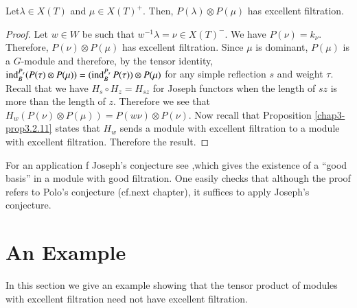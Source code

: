 \begin{corollary}[Joseph]\label{chap5-coro5.2.7}
Let\pageoriginale $\lambda\in X(T)$\label{page54} and $\mu\in X(T)^{+}$. Then,
$P(\lambda)\otimes P(\mu)$ has excellent filtration.
\end{corollary}

\begin{proof}
Let $w\in W$ be such that $w^{-1}\lambda=\nu\in X(T)^{-}$. We have
$P(\nu)=k_{\nu}$. Therefore, $P(\nu)\otimes P(\mu)$ has excellent
filtration. Since $\mu$ is dominant, $P(\mu)$ is a $G$-module and
therefore, by the tensor identity, $\operatorname{ind}^{P_{s}}_{B}(P(\tau)\otimes
P(\mu))=(\operatorname{ind}^{P_{s}}_{B}P(\tau))\otimes P(\mu)$ for any simple
reflection $s$ and weight $\tau$. Recall that we have $H_{s}\circ
H_{z}=H_{sz}$ for Joseph functors when the length of $sz$ is more than
the length of $z$. Therefore we see that $H_{w}(P(\nu)\otimes
P(\mu))=P(w\nu)\otimes P(\nu)$. Now recall that Proposition
\ref{chap3-prop3.2.11} states that $H_{w}$ sends a module with
excellent filtration to a module with excellent filtration. Therefore
the result.
\end{proof}

For an application f Joseph's conjecture see \cite[Theorem
  5.5]{key21},\break which gives the existence of a ``good basis'' in a
module with good filtration. One easily checks that although the proof
refers to Polo's conjecture (cf.\@ next chapter), it suffices to apply
Joseph's conjecture.

\section{An Example}\label{chap5-sec5.3}

In this section we give an example showing that the tensor product of
modules with excellent filtration need not have excellent filtration.

